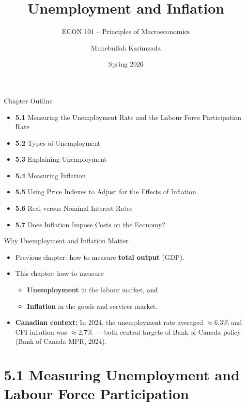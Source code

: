 \documentclass[aspectratio=169]{beamer}
\title{\textbf{Unemployment and Inflation}}
\subtitle{{\large ECON 101 -- Principles of Macroeconomics}}
\author{Muhebullah Karimzada}
\date{Spring 2026}
\begin{document}

\begin{frame}[plain]
  \titlepage
\end{frame}

\begin{frame}{Chapter Outline}
\transfade
\begin{itemize}
  \item \textbf{5.1} Measuring the Unemployment Rate and the Labour Force Participation Rate
  \item \textbf{5.2} Types of Unemployment
  \item \textbf{5.3} Explaining Unemployment
  \item \textbf{5.4} Measuring Inflation
  \item \textbf{5.5} Using Price Indexes to Adjust for the Effects of Inflation
  \item \textbf{5.6} Real versus Nominal Interest Rates
  \item \textbf{5.7} Does Inflation Impose Costs on the Economy?
\end{itemize}
\end{frame}

\begin{frame}{Why Unemployment and Inflation Matter}
\transfade
\begin{itemize}
  \item Previous chapter: how to measure \textbf{total output} (GDP).
  \item This chapter: how to measure
  \begin{itemize}
    \item \textbf{Unemployment} in the labour market, and
    \item \textbf{Inflation} in the goods and services market.
  \end{itemize}
  \item \textbf{Canadian context:} In 2024, the unemployment rate averaged $\approx$6.3\% and CPI inflation was $\approx$2.7\% --- both central targets of Bank of Canada policy (Bank of Canada MPR, 2024).
\end{itemize}
\end{frame}

\section{5.1 Measuring Unemployment and Labour Force Participation}
\end{document}
